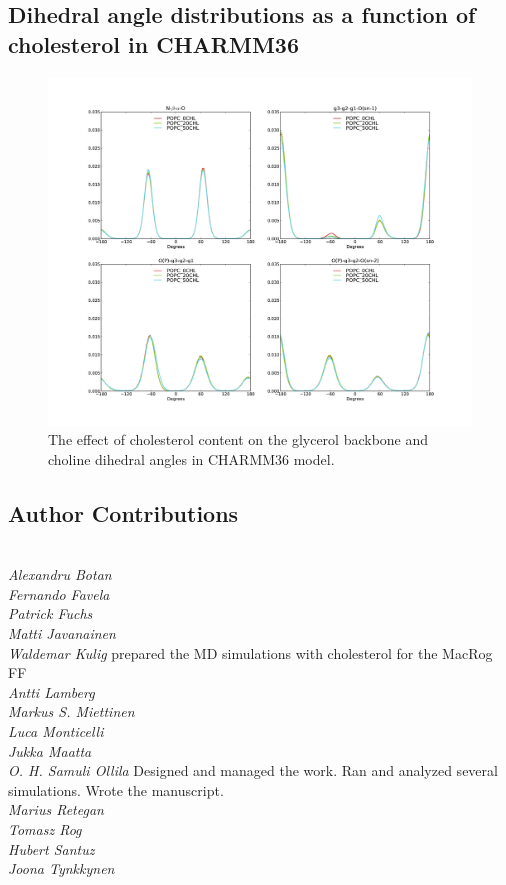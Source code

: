 \documentclass[journal=jacsat,manuscript=article]{achemso}
\begin{document}
\subsection{Dihedral angle distributions as a function of cholesterol in CHARMM36}
\begin{figure}[]
  \centering
  \includegraphics[width=17.2cm]{dihsCHOLcharmm.pdf}
  \caption{\label{dihsCHOLcharmm}
    The effect of cholesterol content on the glycerol backbone and choline dihedral angles in CHARMM36 model.}
\end{figure}

\subsection{Author Contributions}
 \\
{\it Alexandru Botan} \\
{\it Fernando Favela}  \\
{\it Patrick Fuchs} \\
{\it Matti Javanainen} \\
{\it Waldemar Kulig} prepared the MD simulations with cholesterol for the MacRog FF \\
{\it Antti Lamberg}  \\
{\it Markus S. Miettinen}  \\
{\it Luca Monticelli}  \\
{\it Jukka Maatta}  \\
{\it O. H. Samuli Ollila} Designed and managed the work. Ran and analyzed several simulations. Wrote the manuscript.  \\
{\it Marius Retegan}  \\
{\it Tomasz Rog}  \\
{\it Hubert Santuz}  \\
{\it Joona Tynkkynen}  \\
\end{document}
